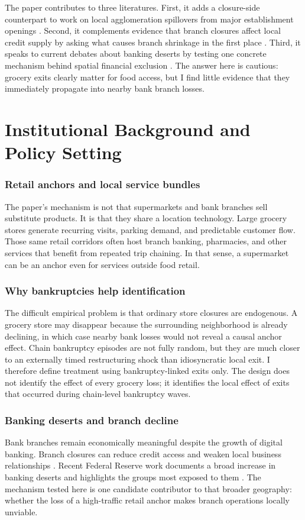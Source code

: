 \documentclass[12pt]{article}
\begin{document}
The paper contributes to three literatures. First, it adds a closure-side counterpart to work on local agglomeration spillovers from major establishment openings \citep{greenstone2010,basker2005}. Second, it complements evidence that branch closures affect local credit supply by asking what causes branch shrinkage in the first place \citep{nguyen2019,jayaratne1996}. Third, it speaks to current debates about banking deserts by testing one concrete mechanism behind spatial financial exclusion \citep{phillyfed2024,fdic2023}. The answer here is cautious: grocery exits clearly matter for food access, but I find little evidence that they immediately propagate into nearby bank branch losses.

\section{Institutional Background and Policy Setting}

\subsubsection*{Retail anchors and local service bundles}
The paper's mechanism is not that supermarkets and bank branches sell substitute products. It is that they share a location technology. Large grocery stores generate recurring visits, parking demand, and predictable customer flow. Those same retail corridors often host branch banking, pharmacies, and other services that benefit from repeated trip chaining. In that sense, a supermarket can be an anchor even for services outside food retail.

\subsubsection*{Why bankruptcies help identification}
The difficult empirical problem is that ordinary store closures are endogenous. A grocery store may disappear because the surrounding neighborhood is already declining, in which case nearby bank losses would not reveal a causal anchor effect. Chain bankruptcy episodes are not fully random, but they are much closer to an externally timed restructuring shock than idiosyncratic local exit. I therefore define treatment using bankruptcy-linked exits only. The design does not identify the effect of every grocery loss; it identifies the local effect of exits that occurred during chain-level bankruptcy waves.

\subsubsection*{Banking deserts and branch decline}
Bank branches remain economically meaningful despite the growth of digital banking. Branch closures can reduce credit access and weaken local business relationships \citep{nguyen2019}. Recent Federal Reserve work documents a broad increase in banking deserts and highlights the groups most exposed to them \citep{phillyfed2024}. The mechanism tested here is one candidate contributor to that broader geography: whether the loss of a high-traffic retail anchor makes branch operations locally unviable.
\end{document}
